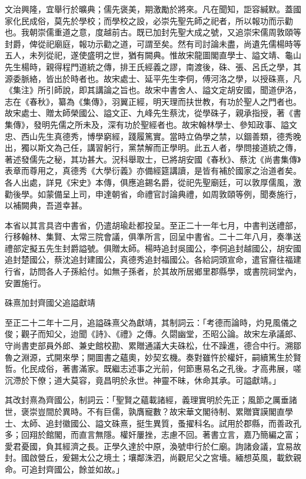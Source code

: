 \begin{pinyinscope}
 文治興隆，宜舉行於曠典；儒先褒美，期激勵於將來。凡在聞知，詎容緘默。蓋國家化民成俗，莫先於學校；而學校之設，必崇先聖先師之祀者，所以報功而示勸也。我朝崇儒重道之意，度越前古。既已加封先聖大成之號，又追崇宋儒周敦頤等封爵，俾從祀廟庭，報功示勸之道，可謂至矣。然有司討論未盡，尚遺先儒楊時等五人，未列從祀，遂使盛明之世，猶有闕典。惟故宋龍圖閣直學士、謚文靖、龜山先生楊時，親得程門道統之傳，排王氏經義之謬，南渡後，硃、張、呂氏之學，其源委脈絡，皆出於時者也。故宋處士、延平先生李侗，傅河洛之學，以授硃熹，凡《集注》所引師說，即其講論之旨也。故宋中書舍人、謚文定胡安國，聞道伊洛，志在《春秋》，纂為《集傳》，羽翼正經，明天理而扶世教，有功於聖人之門者也。故宋處士、贈太師榮國公、謚文正、九峰先生蔡沈，從學硃子，親承指授，著《書集傳》，發明先儒之所未及，深有功於聖經者也。故宋翰林學士、參知政事、謚文忠、西山先生真德秀，博學窮經，踐履篤實。當時立偽學之禁，以錮善類，德秀晚出，獨以斯文為己任，講習躬行，黨禁解而正學明。此五人者，學問接道統之傳，著述發儒先之秘，其功甚大。況科舉取士，已將胡安國《春秋》、蔡沈《尚書集傳》表章而尊用之，真德秀《大學衍義》亦備經筵講讀，是皆有補於國家之治道者矣。各人出處，詳見《宋史》本傳，俱應追錫名爵，從祀先聖廟廷，可以敦厚儒風，激勸後學。如蒙備呈上司，申達朝省，命禮官討論典禮，如周敦頤等例，聞奏施行，以補闕典，吾道幸甚。



 本省以其言具咨中書省，仍遣胡瑜赴都投呈。至正二十一年七月，中書判送禮部，行移翰林、集賢、太常三院會議，俱準所言，回呈中書省。二十二年八月，奏準送禮部定擬五先生封爵謚號。俱贈太師。楊時追封吳國公，李侗追封越國公，胡安國追封楚國公，蔡沈追封建國公，真德秀追封福國公。各給詞頭宣命，遣官齎往福建行省，訪問各人子孫給付。如無子孫者，於其故所居鄉里郡縣學，或書院祠堂內，安置施行。



 硃熹加封齊國父追謚獻靖



 至正二十二年十二月，追謚硃熹父為獻靖，其制詞云：「考德而論時，灼見風儀之俊；觀子而知父，迨聞《詩》、《禮》之傳。久閟幽堂，丕昭公論。故宋左承議郎、守尚書吏部員外郎、兼史館校勘、累贈通議大夫硃松，仕不躁進，德合中行。溯鄒魯之淵源，式開來學；開圖書之蘊奧，妙契玄機。奏對雖忤於權奸，嗣續篤生於賢哲。化民成俗，著書滿家。既繼志述事之光前，何節惠易名之孔後。才高弗展，嗟沉滯於下僚；道大莫容，竟昌明於永世。神靈不昧，休命其承。可謚獻靖。」



 其改封熹為齊國公，制詞云：「聖賢之蘊載諸經，義理實明於先正；風節之厲垂諸世，褒崇豈間於異時。不有巨儒，孰膺寵數？故宋華文閣待制、累贈寶謨閣直學士、太師、追封徽國公、謚文硃熹，挺生異質，蚤擢科名。試用於郡縣，而善政孔多；回翔於館閣，而直言無隱。權奸屢挫，志慮不回。著書立言，嘉乃簡編之富；愛君憂國，負其經濟之長。正學久達於中原，渙號申行於仁廟。詢諸僉議，宜易故封。國啟營丘，爰錫太公之境土；壤鄰洙泗，尚觀尼父之宮墻。緬想英風，載欽親命。可追封齊國公，餘並如故。」




\end{pinyinscope}
